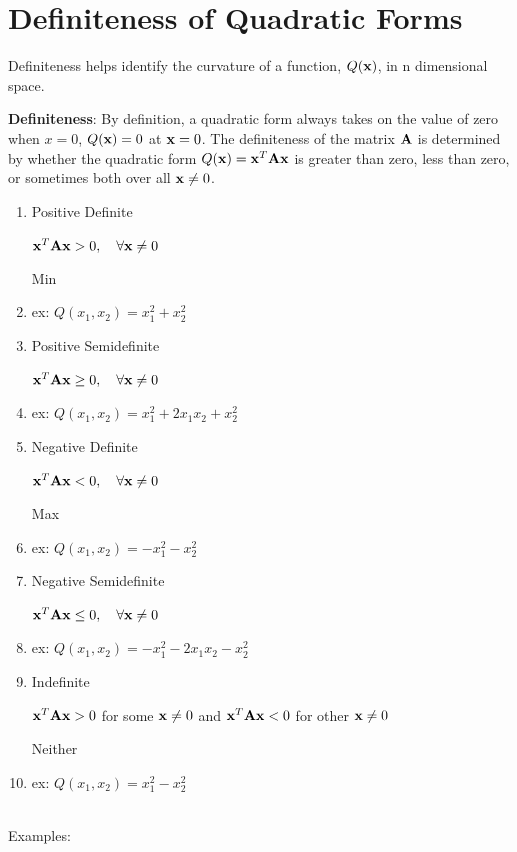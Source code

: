 \documentclass[]{book}
\theoremstyle{definition}
\theoremstyle{definition}
\theoremstyle{definition}
\theoremstyle{remark}
\begin{document}
\section{Definiteness of Quadratic
Forms}\label{definiteness-of-quadratic-forms}

Definiteness helps identify the curvature of a function, \(Q({\bf x})\),
in n dimensional space.

\textbf{Definiteness}: By definition, a quadratic form always takes on
the value of zero when \(x = 0\), \(Q({\bf x})=0\) at \({\bf x}=0\). The
definiteness of the matrix \({\bf A}\) is determined by whether the
quadratic form \(Q({\bf x})={\bf x}^T{\bf A}{\bf x}\) is greater than
zero, less than zero, or sometimes both over all \({\bf x}\ne 0\).

\begin{enumerate}
  \item \parbox[t]{2in}{Positive Definite}
  \parbox[t]{2in}{${\bf x}^T{\bf A}{\bf x}>0, \quad \forall {\bf x}\ne 0$} \quad  Min
    \item[] ex: $Q(x_1,x_2) = x_1^2 + x_2^2$
  \item \parbox[t]{2in}{Positive Semidefinite}
  \parbox[t]{2in}{${\bf x}^T{\bf A}{\bf x}\ge 0, \quad \forall {\bf x}\ne 0$}
    \item[] ex: $Q(x_1,x_2) = x_1^2 + 2x_1x_2 + x_2^2$
  \item \parbox[t]{2in}{Negative Definite}
  \parbox[t]{2in}{${\bf x}^T{\bf A}{\bf x}<0, \quad \forall {\bf x}\ne 0$}  \quad Max
    \item[] ex: $Q(x_1,x_2) = -x_1^2 - x_2^2$
  \item \parbox[t]{2in}{Negative Semidefinite}
  \parbox[t]{2in}{${\bf x}^T{\bf A}{\bf x}\le 0, \quad \forall {\bf x}\ne 0$}
    \item[] ex: $Q(x_1,x_2) = - x_1^2 -2x_1x_2 - x_2^2$
  \item \parbox[t]{2in}{Indefinite}
  \parbox[t]{2in}{${\bf x}^T{\bf A}{\bf x}>0$ for some ${\bf x}\ne 0$ and ${\bf x}^T{\bf A}{\bf x}<0$ for
other ${\bf x}\ne 0$} \quad Neither
    \item[] ex: $Q(x_1,x_2) = x_1^2 - x_2^2$\\\\
\end{enumerate}

Examples:
\end{document}
